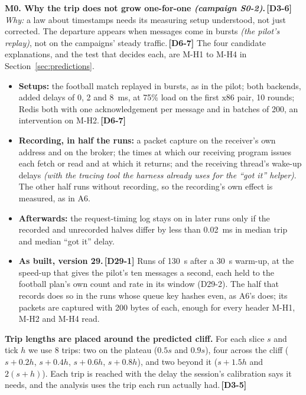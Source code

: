 \documentclass[11pt]{article}
\newcommand{\gl}[1]{{\color{soft}\itshape\small (#1)}}
\newcommand{\chgold}[1]{\,{\color{oldcol}\bfseries\footnotesize[#1]}}
\begin{document}
\textbf{M0. Why the trip does not grow one-for-one \gl{campaign S0-2}.}\chgold{D3-6} \emph{Why:} a law about timestamps needs its measuring setup understood, not just corrected. The departure appears when messages come in bursts \gl{the pilot's replay}, not on the campaigns' steady traffic.\chgold{D6-7} The four candidate explanations, and the test that decides each, are M-H1 to M-H4 in Section~\ref{sec:predictions}.
\begin{itemize}
  \item \textbf{Setups:} the football match replayed in bursts, as in the pilot; both backends, added delays of 0, 2 and 8~ms, at 75\% load on the first x86 pair, 10 rounds; Redis both with one acknowledgement per message and in batches of 200, an intervention on M-H2.\chgold{D6-7}
  \item \textbf{Recording, in half the runs:} a packet capture on the receiver's own address and on the broker; the times at which our receiving program issues each fetch or read and at which it returns; and the receiving thread's wake-up delays \gl{with the tracing tool the harness already uses for the ``got it'' helper}. The other half runs without recording, so the recording's own effect is measured, as in A6.
  \item \textbf{Afterwards:} the request-timing log stays on in later runs only if the recorded and unrecorded halves differ by less than 0.02~ms in median trip and median ``got it'' delay.
  \item \textbf{As built, version 29.}\chgold{D29-1} Runs of 130~s after a 30~s warm-up, at the speed-up that gives the pilot's ten messages a second, each held to the football plan's own count and rate in its window (D29-2). The half that records does so in the runs whose queue key hashes even, as A6's does; its packets are captured with 200 bytes of each, enough for every header M-H1, M-H2 and M-H4 read.
\end{itemize}

\textbf{Trip lengths are placed around the predicted cliff.} For each slice $s$ and tick $h$ we use 8 trips: two on the plateau ($0.5s$ and $0.9s$), four across the cliff ($s + 0.2h$, $s + 0.4h$, $s + 0.6h$, $s + 0.8h$), and two beyond it ($s + 1.5h$ and $2(s + h)$). Each trip is reached with the delay the session's calibration says it needs, and the analysis uses the trip each run actually had.\chgold{D3-5}
\end{document}
